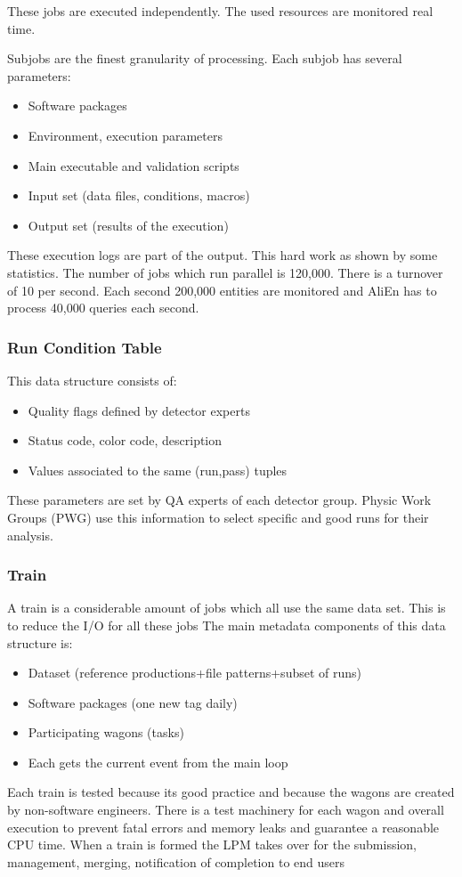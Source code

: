 These jobs are executed independently. The used resources are monitored real time.

Subjobs are the finest granularity of processing. Each subjob has several parameters:
\begin{itemize}
  \item Software packages
  \item Environment, execution parameters
  \item Main executable and validation scripts
  \item Input set (data files, conditions, macros)
  \item Output set (results of the execution)
\end{itemize}
These execution logs are part of the output. This hard work as shown by some statistics. The number of jobs which run parallel  is 120,000. There is a turnover of 10 per second. Each second 200,000 entities are monitored and AliEn has to process 40,000 queries each second.

\subsubsection{Run Condition Table}
This data structure consists of:
\begin{itemize}
  \item Quality flags defined by detector experts
  \item Status code, color code, description
  \item Values associated to the same (run,pass) tuples
\end{itemize}
These parameters are set by QA experts of each detector group. Physic Work Groups (PWG) use this information to select specific and good runs for their analysis.

\subsubsection{Train}
A train is a considerable amount of jobs which all use the same data set. This is to reduce the I/O for all these jobs
The main metadata components of this data structure is:
\begin{itemize}
  \item Dataset (reference productions+file patterns+subset of runs)
  \item Software packages (one new tag daily)
  \item Participating wagons (tasks)
  \item Each gets the current event from the main loop
\end{itemize}
Each train is tested because its good practice and because the wagons are created by non-software engineers. There is a test machinery for each wagon and overall execution to prevent fatal errors and memory leaks and guarantee a reasonable CPU time. When a train is formed the LPM takes over for the submission, management, merging, notification of completion to end users

